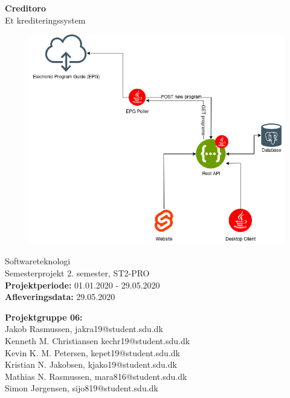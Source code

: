 \begin{titlepage}
\begin{center}
{ \LARGE \bfseries Creditoro \\[0.4cm]}
Et krediteringssystem
\begin{figure}[H]
\centering 
\includegraphics[scale=0.3]{figures/system_logo.png}
\end{figure}

Softwareteknologi\\
\vspace{2mm}
Semesterprojekt 2. semester, ST2-PRO\\
\vspace{2mm}
\textbf{Projektperiode:} 01.01.2020 - 29.05.2020 \\
\vspace{2mm}
\textbf{Afleveringsdata:} 29.05.2020 \\

\vspace{7mm}

\textbf{Projektgruppe 06:} \\
\vspace{2mm}
Jakob Rasmussen, jakra19@student.sdu.dk \\
\vspace{2mm}
Kenneth M. Christiansen kechr19@student.sdu.dk \\
\vspace{2mm}
Kevin K. M. Petersen, kepet19@student.sdu.dk \\
\vspace{2mm}
Kristian N. Jakobsen, kjako19@student.sdu.dk \\
\vspace{2mm}
Mathias N. Rasmussen, mara816@student.sdu.dk \\
\vspace{2mm}
Simon Jørgensen, sijo819@student.sdu.dk \\


\end{center}
\end{titlepage}
